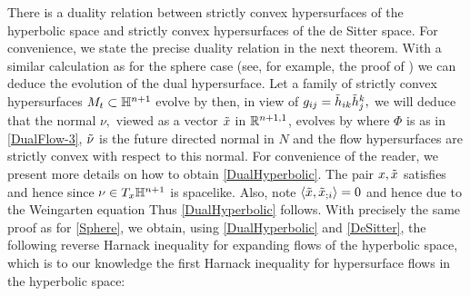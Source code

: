 There is a duality relation between strictly convex hypersurfaces of the hyperbolic space and strictly convex hypersurfaces of the de Sitter space. For convenience, we state the precise duality relation in the next theorem.
With a similar calculation as for the sphere case (see, for example, the proof  of \cite[Lemma~4.2]{Yu:04/2016}) we can deduce the evolution of the dual hypersurface. Let a family of strictly convex hypersurfaces $M_{t}\sub\H^{n+1}$ evolve by
then, in view of $g_{ij}=\~h_{ik}\~h^{k}_{j},$ we will deduce that the normal $\nu,$ viewed as a vector $\~x$ in $\R^{n+1,1}$, evolves by
where $\Phi$ is as in \eqref{DualFlow-3}, $\~\nu$ is the future directed normal in $N$ and the flow hypersurfaces are strictly convex with respect to this normal. For convenience of the reader, we present more details on how to obtain \eqref{DualHyperbolic}. The pair $x,\~x$ satisfies 
 and hence
 since $\nu\in T_x \H^{n+1}$ is spacelike. Also, note $\ip{\~x}{\~x_{;i}}=0$ and hence due to the Weingarten equation
 Thus \eqref{DualHyperbolic} follows.
With precisely the same proof as for \cref{Sphere}, we obtain, using \eqref{DualHyperbolic} and \cref{DeSitter}, the following reverse Harnack inequality for expanding flows of the hyperbolic space, which is to our knowledge the first Harnack inequality for hypersurface flows in the hyperbolic space:
